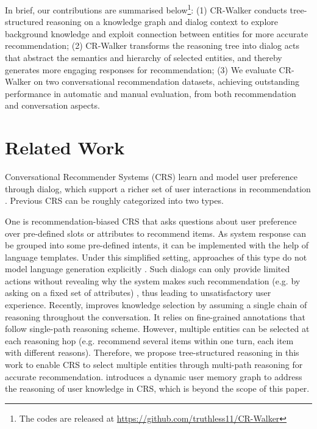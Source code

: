 \documentclass[11pt]{article}
\begin{document}
In brief, our contributions are summarised below\footnote{The codes are released at \url{https://github.com/truthless11/CR-Walker}}: 
(1) CR-Walker conducts tree-structured reasoning on a knowledge graph and dialog context to explore background knowledge and exploit connection between entities for more accurate recommendation;
(2) CR-Walker transforms the reasoning tree into dialog acts that abstract the semantics and hierarchy of selected entities, and thereby generates more engaging responses for recommendation; (3) We evaluate CR-Walker on two conversational recommendation datasets, achieving outstanding performance in automatic and manual evaluation, from both recommendation and conversation aspects.


\section{Related Work}\label{sec:related}

Conversational Recommender Systems (CRS) learn and model user preference through dialog, which support a richer set of user interactions in recommendation \cite{jannach2020survey}. Previous CRS can be roughly categorized into two types. 

One is recommendation-biased CRS \cite{sun2018conversational,zhang2018towards,zhang2020conversational,zou2020towards} that asks questions about user preference over pre-defined slots or attributes to recommend items. As system response can be grouped into some pre-defined intents, it can be implemented with the help of language templates. Under this simplified setting, approaches of this type do not model language generation explicitly \cite{lei2020estimation,lei2020interactive}. Such dialogs can only provide limited actions without revealing why the system makes such recommendation (e.g. by asking on a fixed set of attributes) \cite{christakopoulou2016towards,christakopoulou2018q}, thus leading to unsatisfactory user experience. Recently, \citet{moon2019opendialkg} improves knowledge selection by assuming a single chain of reasoning throughout the conversation. It relies on fine-grained annotations that follow single-path reasoning scheme. However, multiple entities can be selected at each reasoning hop (e.g. recommend several items within one turn, each item with different reasons). Therefore, we propose tree-structured reasoning in this work to enable CRS to select multiple entities through multi-path reasoning for accurate recommendation. \citet{xu2020user} introduces a dynamic user memory graph to address the reasoning of user knowledge in CRS, which is beyond the scope of this paper.
\end{document}
